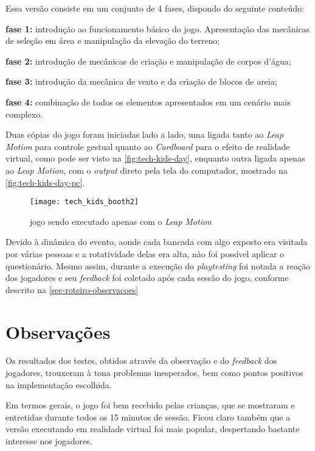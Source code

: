 Essa versão consiste em um conjunto de 4 fases, dispondo do seguinte conteúdo:

\begin{alineas}
	\item \textbf{fase 1:} introdução ao funcionamento básico do jogo. Apresentação das mecânicas de seleção em área e manipulação da elevação do terreno;
	\item \textbf{fase 2:} introdução de mecânicas de criação e manipulação de corpos d'água;
	\item \textbf{fase 3:} introdução da mecânica de vento e da criação de blocos de areia;
	\item \textbf{fase 4:} combinação de todos os elementos apresentados em um cenário mais complexo.
\end{alineas}

Duas cópias do jogo foram iniciadas lado a lado, uma ligada tanto 
ao \textit{Leap Motion} para controle gestual quanto ao \textit{Cardboard} 
para o efeito de realidade virtual, como pode ser visto 
na \autoref{fig:tech-kids-day}, enquanto outra ligada apenas ao 
\textit{Leap Motion}, com o \textit{output} direto pela tela do computador, 
mostrado na \autoref{fig:tech-kids-day-pc}.

\begin{figure}[h]
	\centering
	\caption{jogo sendo executado apenas com o \textit{Leap Motion}}
	\texttt{[image: tech\_kids\_booth2]}
	\legend{\fonteAP}
	\label{fig:tech-kids-day-pc}
\end{figure}

Devido à dinâmica do evento, aonde cada bancada com algo exposto 
era visitada por várias pessoas e a rotatividade delas era alta, 
não foi possível aplicar o questionário. Mesmo assim, durante a 
execução do \textit{playtesting} 
foi notada a reação dos 
jogadores e seu \textit{feedback} foi coletado após cada sessão do jogo, 
conforme descrito na \autoref{sec-roteiro-observacoes}

\section{Observações}\label{sec-roteiro-observacoes}

Os resultados dos testes, obtidos através da observação e do 
\textit{feedback} dos jogadores, trouxeram à tona problemas inesperados, 
bem como pontos positivos na implementação escolhida.

Em termos gerais, o jogo foi bem recebido pelas crianças, que se 
mostraram e entretidas durante todos os 15 minutos de sessão. Ficou claro 
também que a versão executando em realidade virtual foi mais popular, 
despertando bastante interesse nos jogadores.


